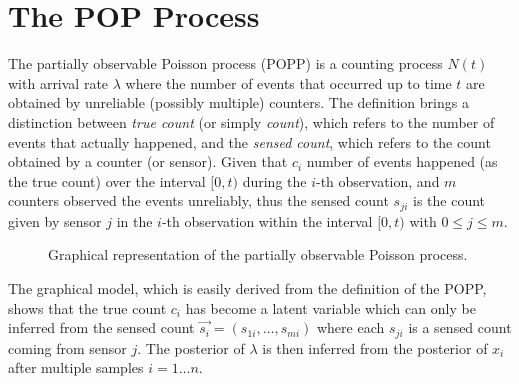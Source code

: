 \section{The POP Process}
\label{sec:popp}

The partially observable Poisson process (POPP) is a counting process $N(t)$ with arrival rate $\lambda$ where the number of events that occurred up to time $t$ are obtained by unreliable (possibly multiple) counters. The definition brings a distinction between \emph{true count} (or simply \emph{count}), which refers to the number of events that actually happened, and the \emph{sensed count}, which refers to the count obtained by a counter (or sensor). Given that $c_i$ number of events happened (as the true count) over the interval $[0, t)$ during the $i$-th observation, and $m$ counters observed the events unreliably, thus the sensed count $s_{ji}$ is the count given by sensor $j$ in the $i$-th observation within the interval $[0, t)$ with $0 \leq j \leq m$. 

\begin{figure}[h!]
	\centering
    \caption{Graphical representation of the partially observable Poisson process.}
	\label{fig:gm_popp}
\end{figure}

The graphical model, which is easily derived from the definition of the POPP, shows that the true count $c_i$ has become a latent variable which can only be inferred from the sensed count $\overrightarrow{s_i} = (s_{1i}, \ldots, s_{mi})$ where each $s_{ji}$ is a sensed count coming from sensor $j$. The posterior of $\lambda$ is then inferred from the posterior of $x_i$ after multiple samples $i = 1 \ldots n$.

